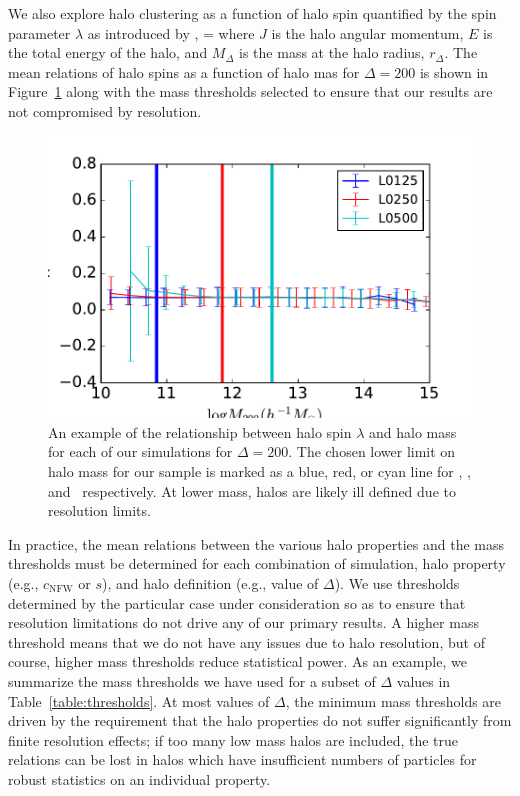 \documentclass[usenatbib,usegraphicx,letterpaper]{mn2e}
\begin{document}
We also explore halo clustering as a function of halo spin quantified 
by the spin parameter $\lambda$ as introduced by \citep{peebles69},
\beq
\lambda = 
\eeq
where $J$ is the halo angular momentum, $E$ is the total energy of the 
halo, and $M_{\Delta}$ is the mass at the halo radius, $r_{\Delta}$. 
The mean relations of halo spins as a function of halo mas for $\Delta=200$ 
is shown in Figure~\ref{fig:spinrelation} along with the mass thresholds 
selected to ensure that our results are not compromised by resolution.

\begin{figure}
\centering
\includegraphics[width=.5\textwidth]{masscut_spin_d200.pdf}
\caption{
An example of the relationship between halo spin $\lambda$ 
and halo mass for each of our simulations for $\Delta =200$. 
The chosen lower limit on halo mass for our sample is marked 
as a blue, red, or cyan line for \simA, \simB, and \simC \ respectively. 
At lower mass, halos are likely ill defined due to resolution limits.
}
\label{fig:spinrelation}
\end{figure}

In practice, the mean relations between the various halo properties and the mass thresholds must be determined 
for each combination of simulation, halo property (e.g., $c_{\mathrm{NFW}}$ or $s$), and halo definition (e.g., value 
of $\Delta$). We use thresholds determined by the particular case under consideration so as to ensure that resolution 
limitations do not drive any of our primary results. A higher mass threshold means that we do not have any 
issues due to halo resolution, but of course, higher mass thresholds reduce statistical power. As an example, we 
summarize the mass thresholds we have used for a subset of $\Delta$ values in Table~\ref{table:thresholds}. 
At most values of $\Delta$, the minimum mass thresholds are driven by the requirement that the halo properties do 
not suffer significantly from finite resolution effects; if too many low mass halos are included, the true relations
can be lost in halos which have insufficient numbers of particles for robust statistics on an individual property.
\end{document}
